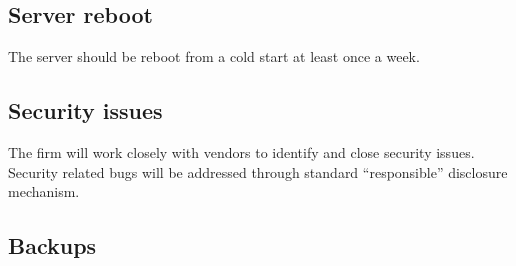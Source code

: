 \subsection{Server reboot}
The server should be reboot from a cold start at least once a week.

\subsection{Security issues}
The firm will work closely with vendors to identify and close security
issues.  Security related bugs will be addressed through standard
``responsible'' disclosure mechanism.

\subsection{Backups}



